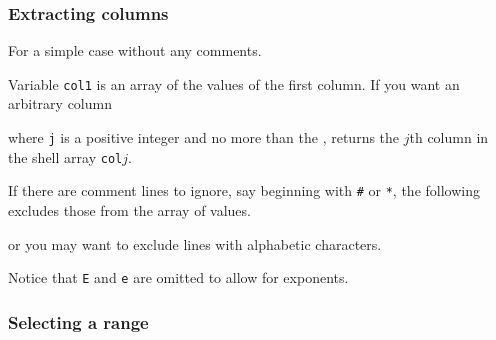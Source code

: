 \documentclass[twoside,11pt,nolof]{starlink}
\begin{document}
\subsubsection{Extracting columns}

For a simple case without any comments.
\begin{small}
\end{small}
Variable \texttt{col1} is an array of the values of the first column.  If
you want an arbitrary column
\begin{small}
\end{small}
where  \texttt{j} is a positive
integer and no more than the , returns the $j$th column in the shell array
\texttt{col}$j$.

If there are comment lines to ignore, say beginning with \texttt{\#} or
\texttt{*}, the following excludes those from the array of values.
\begin{small}
\end{small}
or you may want to exclude lines with alphabetic characters.
\begin{small}
\end{small}
Notice that \texttt{E} and \texttt{e} are omitted to allow for exponents.

\subsubsection{Selecting a range}
\end{document}
